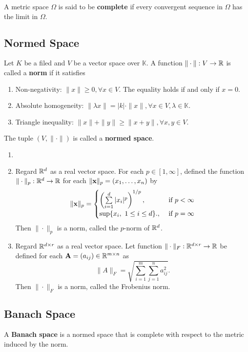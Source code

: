 \begin{definition}
 A metric space $\Omega$ is said to be \textbf{complete} if every convergent sequence in $\Omega$ has the limit in $\Omega$.
\end{definition}

\subsection{Normed Space}

\begin{definition}
 Let $K$ be a filed and $V$ be a vector space over $\mathbb{K}$. A function $\|\cdot\|: V\to \mathbb{R}$ is called a \textbf{norm} if it satisfies
 \begin{enumerate}
  \item Non-negativity: $\|x\|\ge0,\forall x\in V$. The equality holds if and only if $x=0$.
  \item Absolute homogeneity: $\|\lambda x\| = |k|\cdot\|x\|,\forall x\in V, \lambda\in\mathbb{K}$.
  \item Triangle inequality: $\|x\|+\|y\|\ge \|x+y\|,\forall x,y\in V$.
 \end{enumerate}
 The tuple $(V,\|\cdot\|)$ is called a \textbf{normed space}.
\end{definition}

\begin{example}
 \begin{enumerate}
  \item []
  \item Regard $\mathbb{R}^d$ as a real vector space. For each $p\in[1,\infty]$, defined the function $\|\cdot\|_p:\mathbb{R}^d\to\mathbb{R}$ for each $\|\mathbf{x}\|_p = (x_1,\ldots, x_n)$ by
        \begin{equation}
         \|\mathbf{x}\|_p = \begin{cases}
          \left(\sum\limits_{i=1}^d |x_i|^p\right)^{1/p}, & \text{ if } p <\infty \\
          \sup\{x_i, \,\,1\le i \le d\}.,                 & \text{ if } p =\infty
         \end{cases}
        \end{equation}
        Then $\|\cdot\|_p$ is a norm, called the $p$-norm of $\mathbb{R}^d$.
  \item Regard $\mathbb{R}^{d\times r}$ as a real vector space. Let function $\|\cdot\|_F: \mathbb{R}^{d\times r}\to\mathbb{R}$ be defined for each $\mathbf{A} = (a_{ij})\in\mathbb{R}^{m\times n} $ as
        $$\|A\|_F = \sqrt{\sum\limits_{i=1}^m\sum\limits_{j=1}^na_{ij}^2}.$$
        Then $\|\cdot\|_F$ is a norm, called the Frobenius norm.
 \end{enumerate}
\end{example}


\subsection{Banach Space}
\begin{definition}
 A \textbf{Banach space} is a normed space that is complete with respect to the metric induced by the norm.
\end{definition}
